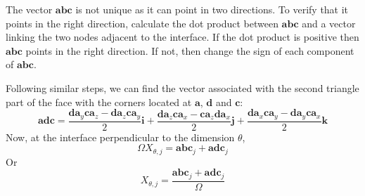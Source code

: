 \documentclass{warpdoc}
\renewcommand{\vec}[1]{\bm{#1}}
\begin{document}
The vector $\vec{abc}$ is not unique as it can point in two directions. To verify that it points in the right direction, calculate the dot product between $\vec{abc}$ and a vector linking the two nodes adjacent to the interface. If the dot product is positive then $\vec{abc}$ points in the right direction. If not, then change the sign of each component of $\vec{abc}$.  

Following similar steps, we can find the vector associated with the second triangle part of the face with the corners located at $\vec{a}$, $\vec{d}$ and $\vec{c}$:
%
\begin{equation}
\vec{adc}=\frac{\vec{da}_y \vec{ca}_z-  \vec{da}_z \vec{ca}_y}{2}\vec{i}+\frac{\vec{da}_z \vec{ca}_x - \vec{ca}_z \vec{da}_x}{2}\vec{j} + \frac{\vec{da}_x \vec{ca}_y - \vec{da}_y \vec{ca}_x}{2}\vec{k}
\end{equation}
%
Now, at the interface perpendicular to the dimension $\theta$, 
%
\begin{equation}
\Omega X_{\theta,j}= \vec{abc}_j + \vec{adc}_j
\end{equation}
%
Or
%
\begin{equation}
X_{\theta,j}= \frac{\vec{abc}_j + \vec{adc}_j}{\Omega }
\end{equation}
%



  
  
\end{document}

